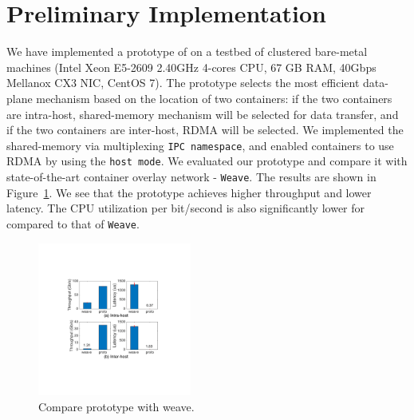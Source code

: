 \section{Preliminary Implementation} \label{sec:implementation}

We have implemented a prototype of \sysname on a testbed of clustered bare-metal
machines (Intel Xeon E5-2609 2.40GHz 4-cores CPU, 67 GB RAM, 40Gbps Mellanox CX3 NIC,
CentOS 7). The prototype selects the most efficient data-plane mechanism based
on the location of two containers: if the two containers are intra-host,
shared-memory mechanism will be selected for data transfer, and if the two
containers are inter-host, RDMA will be selected.  We implemented the
shared-memory via multiplexing \texttt{IPC namespace}, and enabled containers to
use RDMA by using the \texttt{host mode}.  We evaluated our prototype and
compare it with state-of-the-art container overlay network - \texttt{Weave}. The
results are shown in Figure~\ref{fig:sys_eval_proto}. We see that the \sysname
prototype achieves higher throughput and lower latency. The CPU utilization per
bit/second is also significantly lower for \sysname compared to that of
\texttt{Weave}. 

\begin{figure}[ht]
\centering 
\includegraphics[width=0.45\textwidth]{figures/system/eval_proto.pdf}
\caption{Compare \sysname prototype with weave.} 
\label{fig:sys_eval_proto}
\end{figure}


